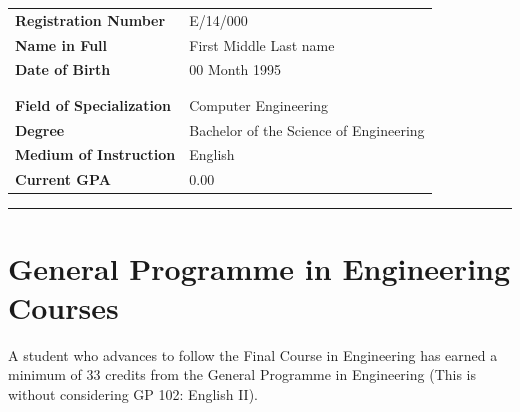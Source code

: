 \documentclass[12pt]{article}
\begin{document}
\begin{table}[H]
\begin{tabularx}{\textwidth}{Xl}
\textbf{Registration Number} & E/14/000 \\
\textbf{Name in Full} & First Middle Last name \\
\textbf{Date of Birth} & 00 Month 1995 \\
\\
\\

\textbf{Field of Specialization} & Computer Engineering \\
\textbf{Degree} & Bachelor of the Science of Engineering \\
\textbf{Medium of Instruction} & English \\
\textbf{Current GPA} & 0.00 \\
\end{tabularx}
\end{table}

\vspace{-15pt}

\noindent\rule{\textwidth}{1pt}

\vspace{-20pt}

\section*{General Programme in Engineering Courses}

A student who advances to follow the Final Course in Engineering has earned a minimum of 33 credits from the General Programme in Engineering (This is without considering GP 102: English II).
\end{document}
